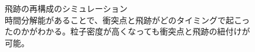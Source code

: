 \begin{figure}[h]
\begin{minipage}[b]{0.5\linewidth}
        \label{fg:ATLAS_4Dtrack}
    \end{minipage}
    \caption[飛跡の再構成のシミュレーション\cite{ATL-PHYS-PUB-2023-023}]{飛跡の再構成のシミュレーション\cite{ATL-PHYS-PUB-2023-023}\\時間分解能があることで、衝突点と飛跡がどのタイミングで起こったのかがわかる。粒子密度が高くなっても衝突点と飛跡の紐付けが可能。}
    \label{fg:4Dtrack_ATLAS}
\end{figure}


